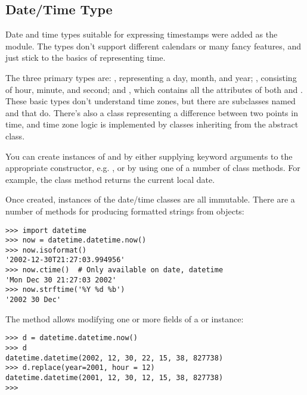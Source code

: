 \documentclass{howto}
\begin{document}
\subsection{Date/Time Type}


Date and time types suitable for expressing timestamps were added as
the  module.  The types don't support different
calendars or many fancy features, and just stick to the basics of
representing time.

The three primary types are: , representing a day, month,
and year; , consisting of hour, minute, and second; and
, which contains all the attributes of both
 and .  These basic types don't understand
time zones, but there are subclasses named  and
 that do.  There's also a
 class representing a difference between two points
in time, and time zone logic is implemented by classes inheriting from
the abstract  class.

You can create instances of  and  by either
supplying keyword arguments to the appropriate constructor,
e.g. , or by using
one of a number of class methods.  For example, the 
class method returns the current local date.

Once created, instances of the date/time classes are all immutable.
There are a number of methods for producing formatted strings from
objects:

\begin{verbatim}
>>> import datetime
>>> now = datetime.datetime.now()
>>> now.isoformat()
'2002-12-30T21:27:03.994956'
>>> now.ctime()  # Only available on date, datetime
'Mon Dec 30 21:27:03 2002'
>>> now.strftime('%Y %d %b')
'2002 30 Dec'
\end{verbatim}

The  method allows modifying one or more fields 
of a  or  instance:

\begin{verbatim}
>>> d = datetime.datetime.now()
>>> d
datetime.datetime(2002, 12, 30, 22, 15, 38, 827738)
>>> d.replace(year=2001, hour = 12)
datetime.datetime(2001, 12, 30, 12, 15, 38, 827738)
>>>
\end{verbatim}
\end{document}
